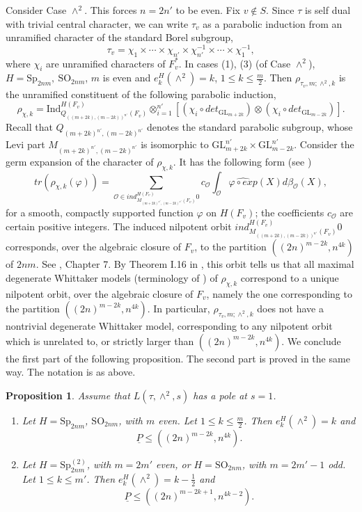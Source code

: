 \documentclass[12pts]{amsart}
\newcommand{\GL}{{\mathrm{GL}}}
\newcommand{\Ind}{{\mathrm{Ind}}}
\newcommand{\SO}{{\mathrm{SO}}}
\newcommand{\Sp}{{\mathrm{Sp}}}
\newtheorem{prop}[thm]{Proposition}
\begin{document}
Consider Case $\wedge^2$. This forces $n=2n'$ to be even. Fix $v\notin S$. Since $\tau$ is self dual with trivial central character, we can write $\tau_v$ as a parabolic induction from an unramified character of the standard Borel subgroup,
\begin{equation}\label{3.1}
\tau_v=\chi_1\times\cdots\times \chi_{n'}\times\chi^{-1}_{n'}\times\cdots\times\chi^{-1}_1,
\end{equation}
where $\chi_i$ are unramified characters of $F_v^*$. In cases (1), (3) (of Case $\wedge^2$), $H=\Sp_{2nm},\  \SO_{2nm}$, $m$ is even and $e_k^H(\wedge^2)=k$, $1\leq k\leq \frac{m}{2}$. Then $\rho_{\tau_v,m;\wedge^2,k}$ is the unramified constituent of the following parabolic induction, 
\begin{equation}\label{3.2}
\rho_{\chi,k}=\Ind^{H(F_v)}_{Q_{((m+2k),(m-2k))^{n'}}(F_v)}\otimes_{i=1}^{n'}[(\chi_i\circ det_{\GL_{m+2k}}) \otimes (\chi_i\circ det_{\GL_{m-2k}})].
\end{equation}
Recall that $Q_{(m+2k)^{n'},(m-2k)^{n'}}$ denotes the standard parabolic subgroup, whose Levi part $M_{(m+2k)^{n'},(m-2k)^{n'}}$ is isomorphic to $\GL_{m+2k}^{n'}\times \GL_{m-2k}^{n'}$.
Consider the germ expansion of the character of $\rho_{\chi,k}$.
It has the following form (see \cite{MW87})
\begin{equation}\label{3.3}
tr (\rho_{\chi,k}(\varphi))=\sum_{\mathcal{O}\in
	ind_{M_{(m+2k)^{n'},(m-2k)^{n'}}(F_v)}^{H(F_v)}0}c_{\mathcal{O}}\int_{\mathcal{O}}\widehat{\varphi\circ
	exp}(X)d\beta_{\mathcal{O}}(X),
\end{equation}
for a smooth, compactly supported function $\varphi$ on
$H(F_v)$; the coefficients $c_{\mathcal{O}}$ are certain
positive integers. The induced nilpotent orbit
$ind_{M_{((m+2k),(m-2k))^{n'}}(F_v)}^{H(F_v)}0$ corresponds, over the algebraic
closure of $F_v$, to the partition $((2n)^{m-2k},n^{4k})$ of $2nm$. See
\cite{CM93}, Chapter 7. By Theorem I.16 in \cite{MW87}, this orbit
tells us that all maximal degenerate Whittaker models (terminology
of \cite{MW87}) of $\rho_{\chi,k}$ correspond to a unique
nilpotent orbit, over the algebraic closure of $F_v$, namely the one
corresponding to the partition $((2n)^{m-2k},n^{4k})$. In particular,
$\rho_{\tau_v,m;\wedge^2,k}$ does not have a nontrivial degenerate Whittaker model,
corresponding to any nilpotent orbit which is unrelated to, or
strictly larger than $((2n)^{m-2k},n^{4k})$. We conclude the first part of the following proposition. The second part is proved in the same way. The notation is as above. 
\begin{prop}\label{prop 3.1}
Assume that $L(\tau,\wedge^2,s)$ has a pole at $s=1$. 	
\begin{enumerate}
\item Let $H=\Sp_{2nm}$, $\SO_{2nm}$, with $m$ even. Let $1\leq k\leq \frac{m}{2}$. Then $e_k^H(\wedge^2)=k$ and
$$
\underline{P}\leq ((2n)^{m-2k},n^{4k}).
$$
\item Let $H=\Sp^{(2)}_{2nm}$, with $m=2m'$ even, or $H=\SO_{2nm}$, with $m=2m'-1$ odd. Let $1\leq k\leq m'$. Then $e_k^H(\wedge^2)=k-\frac{1}{2}$ and
$$
\underline{P}\leq ((2n)^{m-2k+1},n^{4k-2}).
$$
\end{enumerate}
\end{prop}
\end{document}
